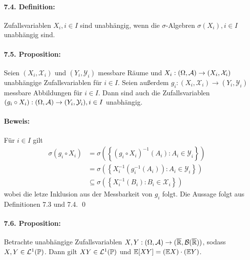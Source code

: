 \paragraph{7.4. Definition:}Zufallsvariablen $X_i,i\in I$ sind unabh\"angig, wenn die $\sigma$-Algebren $\sigma(X_i),i\in I$ unabh\"angig sind.

\paragraph{7.5. Proposition:}Seien $(X_i,\mathcal{X}_i)$ und $(Y_i,\mathcal{Y}_i)$ messbare R\"aume und $X_i:(\Omega,\mathcal{A})\to(X_i,\mathcal{X}_i)$ unabh\"angige Zufallsvariablen f\"ur $i\in I$. Seien au\ss{}erdem $g_i:(X_i,\mathcal{X}_i)\to(Y_i,\mathcal{Y}_i)$ messbare Abbildungen f\"ur $i\in I$. Dann sind auch die Zufallsvariablen $(g_i\circ X_i):(\Omega,\mathcal{A})\to(Y_i,\mathcal{Y}_i), i\in I$ unabh\"angig. 

\paragraph{Beweis:}F\"ur $i\in I$ gilt
\begin{align*}
    \sigma(g_i\circ X_i)&=\sigma\left(\left\{(g_i\circ X_i)^{-1}(A_i):A_i\in\mathcal{Y}_i\right\}\right)\\
    &=\sigma\left(\left\{X_i^{-1}\left(g_i^{-1}(A_i)\right):A_i\in\mathcal{Y}_i\right\}\right)\\
    &\subseteq\sigma\left(\left\{X_i^{-1}\left(B_i\right):B_i\in\mathcal{X}_i\right\}\right)
\end{align*}
wobei die letze Inklusion aus der Messbarkeit von $g_i$ folgt. Die Aussage folgt aus Definitionen 7.3 und 7.4. \qed

\paragraph{7.6. Proposition:}Betrachte unabh\"angige Zufallsvariablen $X,Y:(\Omega,\mathcal{A})\to(\overline{\mathbb{R}},\mathcal{B}(\overline{\mathbb{R}}))$, sodass $X,Y\in\mathcal{L}^1(\mathbb{P})$. Dann gilt $XY\in\mathcal{L}^1(\mathbb{P})$ und $\mathbb{E}[XY]=(\mathbb{E} X)\cdot (\mathbb{E} Y)$.

